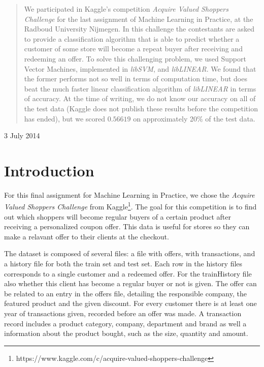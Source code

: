 \documentclass[a4paper]{jmlr}
\begin{document}
\begin{titlepage}
\begin{center}
	\begin{abstract}
		We participated in Kaggle's competition \emph{Acquire Valued Shoppers Challenge} for the last assignment of Machine Learning in Practice, at the Radboud University Nijmegen. In this challenge the contestants are asked to provide a classification algorithm that is able to predict whether a customer of some store will become a repeat buyer after receiving and redeeming an offer. To solve this challenging problem, we used Support Vector Machines, implemented in \emph{libSVM}, and \emph{libLINEAR}. We found that the former performs not so well in terms of computation time, but does beat the much faster linear classification algorithm of \emph{libLINEAR} in terms of accuracy. At the time of writing, we do not know our accuracy on all of the test data (Kaggle does not publish these results before the competition has ended), but we scored $0.56619$ on approximately 20\% of the test data.
	\end{abstract}
	\vspace{.7cm}

	{\large 3 July 2014}
	\vfill
	\end{center}

\end{titlepage}

\newpage

\section{Introduction}
For this final assignment for Machine Learning in Practice, we chose the \emph{Acquire Valued Shoppers Challenge} from Kaggle\footnote{https://www.kaggle.com/c/acquire-valued-shoppers-challenge}. The goal for this competition is to find out which shoppers will become regular buyers of a certain product after receiving a personalized coupon offer. This data is useful for stores so they can make a relavant offer to their clients at the checkout.

The dataset is composed of several files: a file with offers, with transactions, and a history file for both the train set and test set. Each row in the history files corresponds to a single customer and a redeemed offer. For the trainHistory file also whether this client has become a regular buyer or not is given. The offer can be related to an entry in the offers file, detailing the responsible company, the featured product and the given discount. For every customer there is at least one year of transactions given, recorded before an offer was made. A transaction record includes a product category, company, department and brand as well a information about the product bought, such as the size, quantity and amount.
\end{document}
